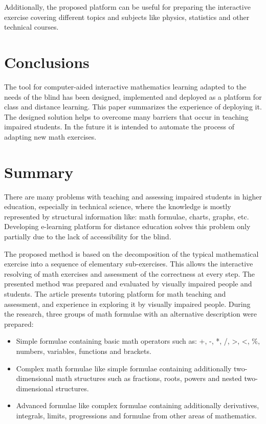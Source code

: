 \documentclass[12pt,1p]{elsarticle}
\begin{document}
	Additionally, the proposed platform can be useful for preparing the interactive exercise covering different topics and subjects like physics, statistics and other technical courses.

\section{Conclusions}
	The tool for computer-aided interactive mathematics learning adapted to the needs of the blind has been designed, implemented and deployed as a platform for class and distance learning. This paper summarizes the experience of deploying it. The designed solution helps to overcome many barriers that occur in teaching impaired students. In the future it is intended to automate the process of adapting new math exercises.

\section{Summary}
	There are many problems with teaching and assessing impaired students in higher education, especially in technical science, where the knowledge is mostly represented by structural information like: math formulae, charts, graphs, etc. Developing e-learning platform for distance education solves this problem only partially due to the lack of accessibility for the blind.
	
	The proposed method is based on the decomposition of the typical mathematical exercise into a sequence of elementary sub-exercises. This allows the interactive resolving of math exercises and assessment of the correctness at every step. The presented method was prepared and evaluated by visually impaired people and students. The article presents tutoring platform for math teaching and assessment, and experience in exploring it by visually impaired people. During the research, three groups of math formulae with an alternative description were prepared:
\begin{itemize}
    \item Simple formulae containing basic math operators such as: +, -, *, /, \textgreater, \textless, \%, numbers, variables, functions and brackets.
    \item Complex math formulae like simple formulae containing additionally two-dimensional math structures such as fractions, roots, powers and nested two-dimensional structures.
    \item Advanced formulae like complex formulae containing additionally derivatives, integrals, limits, progressions and formulae from other areas of mathematics.
\end{itemize}
\end{document}
